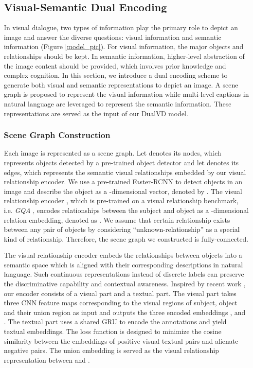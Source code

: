 \documentclass[letterpaper]{article} \usepackage{aaai20}  \usepackage{times}  \usepackage{helvet} \usepackage{courier}  \usepackage[hyphens]{url}  \usepackage{graphicx} \urlstyle{rm} \def\UrlFont{\rm}  \usepackage{graphicx}  \frenchspacing  \setlength{\pdfpagewidth}{8.5in}  \setlength{\pdfpageheight}{11in}  \usepackage{mathrsfs} \usepackage{amsfonts,amssymb}  \usepackage{tabularx} \usepackage{url}
\begin{document}
\subsection{Visual-Semantic Dual Encoding}
\label{DualEncoding}

In visual dialogue, two types of information play the primary role to depict an image and answer the diverse questions: visual information and semantic information (Figure \ref{model_pic}). For visual information, the major objects and relationships should be kept. In semantic information, higher-level abstraction of the image content should be provided, which involves prior knowledge and complex cognition. In this section, we introduce a dual encoding scheme to generate both visual and semantic representations to depict an image. A scene graph is proposed to represent the visual information while multi-level captions in natural language are leveraged to represent the semantic information. These representations are served as the input of our DualVD model. 

\subsubsection{Scene Graph Construction} Each image is represented as a scene graph. Let  denotes its nodes, which represents objects detected by a pre-trained object detector and let  denotes its edges, which represents the semantic visual relationships embedded by our visual relationship encoder. 
We use a pre-trained Faster-RCNN \cite{Ren2017Faster} to detect  objects in an image and describe the object  as a -dimensional vector, denoted by . The visual relationship encoder \cite{zhang2019large}, which is pre-trained on a visual relationship benchmark, i.e. \textit{GQA} \cite{hudson2019GQA}, encodes relationships between the subject  and object  as a -dimensional relation embedding, denoted as . We assume that certain relationship exists between any pair of objects by considering ``unknown-relationship'' as a special kind of relationship. Therefore, the scene graph we constructed is fully-connected.

The visual relationship encoder embeds the relationships between objects into a semantic space which is aligned with their corresponding descriptions in natural language. Such continuous representations instead of discrete labels can preserve the discriminative capability and contextual awareness. 
Inspired by recent work \cite{zhang2019large}, our encoder consists of a visual part and a textual part. The visual part takes three CNN feature maps corresponding to the visual regions of subject, object and their union region as input and outputs the three encoded embeddings ,  and . The textual part uses a shared GRU to encode the annotations and yield textual embeddings. The loss function is designed to minimize the cosine similarity between the embeddings of positive visual-textual pairs and alienate negative pairs.  The union embedding  is served as the visual relationship representation  between  and . 
\end{document}
